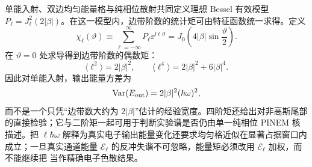 单能入射、双边均匀能量格与纯相位散射共同定义理想 Bessel 有效模型 $P_\ell=J_\ell^2(2|\beta|)$。在这一模型内，边带阶数的统计矩可由特征函数统一求得。定义
\begin{equation}
{
\chi_\ell(\vartheta)
\equiv\sum_{\ell=-\infty}^{\infty}P_\ell \ee^{\ii\ell\vartheta}
=J_0\!\left(4|\beta|\sin\frac{\vartheta}{2}\right).}
\label{eq:pinem-sideband-characteristic-dp83}
\end{equation}
在 $\vartheta=0$ 处求导得到边带阶数的偶数矩：
\begin{equation}
{
\langle \ell^2\rangle=2|\beta|^2,
\qquad
\langle \ell^4\rangle=2|\beta|^2+6|\beta|^4.}
\label{eq:pinem-sideband-moments-dp83}
\end{equation}
因此对单能入射，输出能量方差为
\begin{equation}
{
\operatorname{Var}(E_{\rm out})
=2|\beta|^2(\hbar\omega)^2,}
\label{eq:pinem-energy-variance-dp83}
\end{equation}
而不是一个只凭“边带数大约为 $2|\beta|$”估计的经验宽度。四阶矩还给出对非高斯尾部的直接检验；它与二阶矩一起可用于判断实验谱是否仍由单一纯相位 PINEM 核描述。把 $\ell\hbar\omega$ 解释为真实电子输出能量变化还要求均匀格近似在显著占据窗口内成立；一旦真实通道能量 $\mathcal E_\ell$ 的反冲失谐不可忽略，能量矩必须改用 $\mathcal E_\ell$ 加权，而不能继续把 当作精确电子色散结果。

